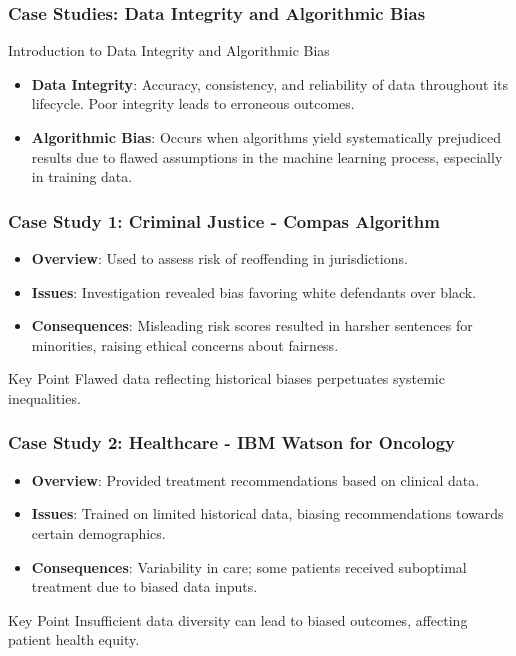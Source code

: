 \documentclass{beamer}
\begin{document}
\begin{frame}[fragile]
    \frametitle{Case Studies: Data Integrity and Algorithmic Bias}
    
    \begin{block}{Introduction to Data Integrity and Algorithmic Bias}
        \begin{itemize}
            \item \textbf{Data Integrity}: Accuracy, consistency, and reliability of data throughout its lifecycle. Poor integrity leads to erroneous outcomes.
            \item \textbf{Algorithmic Bias}: Occurs when algorithms yield systematically prejudiced results due to flawed assumptions in the machine learning process, especially in training data.
        \end{itemize}
    \end{block}
\end{frame}

\begin{frame}[fragile]
    \frametitle{Case Study 1: Criminal Justice - Compas Algorithm}
    
    \begin{itemize}
        \item \textbf{Overview}: Used to assess risk of reoffending in jurisdictions.
        \item \textbf{Issues}: Investigation revealed bias favoring white defendants over black.
        \item \textbf{Consequences}: Misleading risk scores resulted in harsher sentences for minorities, raising ethical concerns about fairness.
    \end{itemize}
    
    \begin{block}{Key Point}
        Flawed data reflecting historical biases perpetuates systemic inequalities.
    \end{block}
\end{frame}

\begin{frame}[fragile]
    \frametitle{Case Study 2: Healthcare - IBM Watson for Oncology}
    
    \begin{itemize}
        \item \textbf{Overview}: Provided treatment recommendations based on clinical data.
        \item \textbf{Issues}: Trained on limited historical data, biasing recommendations towards certain demographics.
        \item \textbf{Consequences}: Variability in care; some patients received suboptimal treatment due to biased data inputs.
    \end{itemize}
    
    \begin{block}{Key Point}
        Insufficient data diversity can lead to biased outcomes, affecting patient health equity.
    \end{block}
\end{frame}
\end{document}
